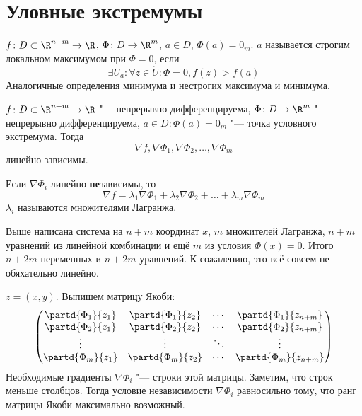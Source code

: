 \section{Уловные экстремумы}

\begin{Def}
	$f\colon D \subset \R^{n+m} \to \R$, $\Phi\colon D \to \R^m$, $a \in D$, $\Phi(a) = 0_m$.
	$a$ называется строгим локальном максимумом при $\Phi = 0$, если
	\[ \exists U_a\colon \forall z \in \mathring U\colon \Phi = 0, f(z) > f(a) \]
	Аналогичные определения минимума и нестрогих максимума и минимума.
\end{Def}

\begin{theorem}
	$f\colon D \subset \R^{n+m} \to \R$ "--- непрерывно дифференцируема,
	$\Phi\colon D \to \R^m$ "--- непрерывно дифференцируема,
	$a \in D\colon \Phi(a) = 0_m$ "--- точка условного экстремума.
	Тогда
	\[ \nabla f, \nabla \Phi_1, \nabla \Phi_2, \dots, \nabla \Phi_m \]
	линейно зависимы.
\end{theorem}
\begin{Def}
	Если $\nabla \Phi_i$ линейно \textbf{не}зависимы, то
	\[ \nabla f = \lambda_1 \nabla \Phi_1 + \lambda_2 \nabla \Phi_2 + \dots + \lambda_m \nabla \Phi_m \]
	$\lambda_i$ называются множителями Лагранжа.
\end{Def}
\begin{Rem}
	Выше написана система на $n + m$ координат $x$, $m$ множителей Лагранжа,
	$n + m$ уравнений из линейной комбинации и ещё $m$ из условия $\Phi(x) = 0$.
	Итого $n + 2m$ переменных и $n + 2m$ уравнений.
	К сожалению, это всё совсем не обяхательно линейно.
\end{Rem}
\begin{Rem}
	$z = (x, y)$. Выпишем матрицу Якоби:
	\[
		\begin{pmatrix}
			\partd{\Phi_1}{z_1} & \partd{\Phi_1}{z_2} & \cdots & \partd{\Phi_1}{z_{n+m}} \\
			\partd{\Phi_2}{z_1} & \partd{\Phi_2}{z_2} & \cdots & \partd{\Phi_2}{z_{n+m}} \\
			\vdots & \vdots & \ddots & \vdots \\
			\partd{\Phi_m}{z_1} & \partd{\Phi_m}{z_2} & \cdots & \partd{\Phi_m}{z_{n+m}} \\
		\end{pmatrix}
	\]
	Необходимые градиенты $\nabla \Phi_i$ "--- строки этой матрицы.
	Заметим, что строк меньше столбцов.
	Тогда условие независимости $\nabla \Phi_i$ равносильно тому, что ранг матрицы Якоби максимально возможный.
\end{Rem}
